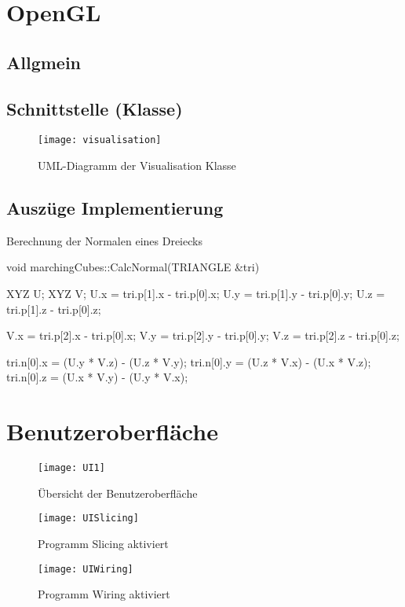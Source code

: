 \section{OpenGL}
\subsection{Allgmein}
\subsection{Schnittstelle (Klasse)}
\begin{figure}[H]
	\centering
	\texttt{[image: visualisation]}
	\caption{UML-Diagramm der Visualisation Klasse}
	\label{fig:visualisation}
\end{figure}

\subsection{Auszüge Implementierung}
\begin{program}
	\caption{Berechnung der Normalen eines Dreiecks}
	\label{prog:calcNormal}
\begin{CCode}
	void marchingCubes::CalcNormal(TRIANGLE &tri){
		XYZ U;
		XYZ V;
		U.x = tri.p[1].x - tri.p[0].x;
		U.y = tri.p[1].y - tri.p[0].y;
		U.z = tri.p[1].z - tri.p[0].z;
		
		V.x = tri.p[2].x - tri.p[0].x;
		V.y = tri.p[2].y - tri.p[0].y;
		V.z = tri.p[2].z - tri.p[0].z;
		
		tri.n[0].x = (U.y * V.z) - (U.z * V.y);
		tri.n[0].y = (U.z * V.x) - (U.x * V.z);
		tri.n[0].z = (U.x * V.y) - (U.y * V.x);
	}
\end{CCode}
\end{program}

\section{Benutzeroberfläche}
\begin{figure}
	\centering
	\texttt{[image: UI1]}
	\caption{Übersicht der Benutzeroberfläche}
	\label{fig:UI1}
\end{figure}

\begin{figure}
	\centering
	\texttt{[image: UISlicing]}
	\caption{Programm Slicing aktiviert}
	\label{fig:UISlicing}
\end{figure}

\begin{figure}
	\centering
	\texttt{[image: UIWiring]}
	\caption{Programm Wiring aktiviert}
	\label{fig:UIWiring}
\end{figure}